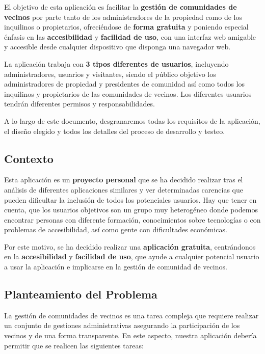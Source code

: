 El objetivo de esta aplicación es facilitar la \textbf{gestión de comunidades de vecinos} por parte tanto de los administradores de la propiedad como de los inquilinos o propietarios, ofreciéndose de \textbf{forma gratuita} y poniendo especial énfasis en las \textbf{accesibilidad} y \textbf{facilidad de uso}, con una interfaz web amigable y accesible desde cualquier dispositivo que disponga una navegador web.

La aplicación trabaja con \textbf{3 tipos diferentes de usuarios}, incluyendo administradores, usuarios y visitantes, siendo el público objetivo los administradores de propiedad y presidentes de comunidad así como todos los inquilinos y propietarios de las comunidades de vecinos. Los diferentes usuarios tendrán diferentes permisos y responsabilidades.

A lo largo de este documento, desgranaremos todas los requisitos de la aplicación, el diseño elegido y todos los detalles del proceso de desarrollo y testeo.

\subsection{Contexto}
Esta aplicación es un \textbf{proyecto personal} que se ha decidido realizar tras el análisis de diferentes aplicaciones similares y ver determinadas carencias que pueden dificultar la inclusión de todos los potenciales usuarios. Hay que tener en cuenta, que los usuarios objetivos son un grupo muy heterogéneo donde podemos encontrar personas con diferente formación, conocimientos sobre tecnologías o con problemas de accesibilidad, así como gente con dificultades económicas.

Por este motivo, se ha decidido realizar una \textbf{aplicación gratuita}, centrándonos en la \textbf{accesibilidad} y \textbf{facilidad de uso}, que ayude a cualquier potencial usuario a usar la aplicación e implicarse en la gestión de comunidad de vecinos. 

\subsection{Planteamiento del Problema}
La gestión de comunidades de vecinos es una tarea compleja que requiere realizar un conjunto de gestiones administrativas asegurando la participación de los vecinos y de una forma transparente. En este aspecto, nuestra aplicación debería permitir que se realicen las siguientes tareas:

